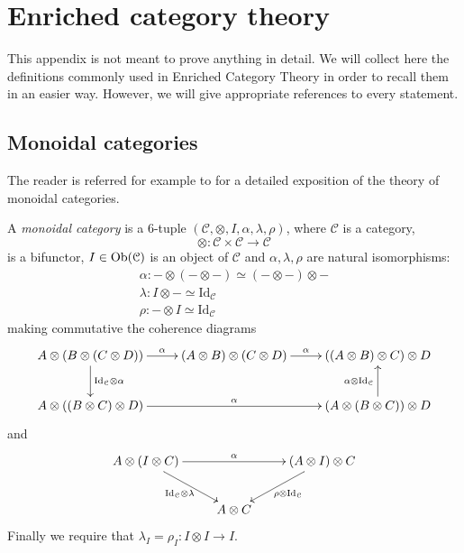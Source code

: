 \chapter{Enriched category theory}

\begin{refsection}

This appendix is not meant to prove anything in detail. We will collect here the definitions commonly used in Enriched Category Theory in order to recall them in an easier way. However, we will give appropriate references to every statement.

\section{Monoidal categories}

The reader is referred for example to \cite[Ch. VII]{cwm} for a detailed exposition of the theory of monoidal categories.

\begin{defin}
A \emph{monoidal category} is a 6-tuple $(\mathcal C, \otimes, I, \alpha, \lambda, \rho)$, where $\mathcal C$ is a category,
\[
\otimes \colon \mathcal C \times \mathcal C \to \mathcal C
\]
is a bifunctor, $I \in \operatorname{Ob}(\mathcal C)$ is an object of $\mathcal C$ and $\alpha, \lambda, \rho$ are natural isomorphisms:
\begin{gather*}
\alpha \colon - \otimes (- \otimes -) \simeq (- \otimes -) \otimes - \\
\lambda \colon I \otimes - \simeq \mathrm{Id}_{\mathcal C} \\
\rho \colon - \otimes I \simeq \mathrm{Id}_{\mathcal C}
\end{gather*}
making commutative the coherence diagrams
\[
\xymatrix{
A \otimes (B \otimes (C \otimes D)) \ar[d]^{\mathrm{Id}_{\mathcal C} \otimes \alpha} \ar[r]^-\alpha & (A \otimes B) \otimes (C \otimes D) \ar[r]^\alpha & ((A \otimes B) \otimes C) \otimes D \\ A \otimes ((B \otimes C) \otimes D) \ar[rr]^\alpha & & (A \otimes (B \otimes C)) \otimes D \ar[u]^{\alpha \otimes \mathrm{Id}_{\mathcal C}}
}
\]
and
\[
\xymatrix{
A \otimes (I \otimes C) \ar[rr]^-\alpha  \ar[dr]_{\mathrm{Id}_{\mathcal C} \otimes \lambda} & & (A \otimes I) \otimes C \ar[dl]^{\rho \otimes \mathrm{Id}_{\mathcal C}} \\ & A \otimes C
}
\]
Finally we require that $\lambda_I = \rho_I \colon I \otimes I \to I$.
\end{defin}


\end{refsection}
